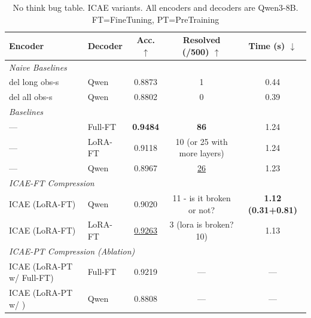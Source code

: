 \begin{table}[h]
  \centering
  \small
  \setlength{\tabcolsep}{4pt}
  \renewcommand{\arraystretch}{1.05}

  \begin{tabular}{|ll|ccc|}
      \hline
      \textbf{Encoder} & \textbf{Decoder} & \textbf{Acc. $\uparrow$} & \textbf{Resolved (/500) $\uparrow$} & \textbf{Time (s) $\downarrow$} \\
      \hline
      \multicolumn{5}{|l|}{\hspace{1em}\textit{Naive Baselines}} \\
      \hline
      del long obs-s            &     Qwen       & 0.8873 & 1         & 0.44                      \\
      del all obs-s             &     Qwen       & 0.8802 & 0         & 0.39                      \\
      \hline
      \multicolumn{5}{|l|}{\hspace{1em}\textit{Baselines}} \\
      \hline
      —                         & Full-FT   & \textbf{0.9484} & \textbf{86}              & 1.24                      \\
      —                         & LoRA-FT   & 0.9118 & 10 (or 25 with more layers)       & 1.24                      \\
      —                         & Qwen      & 0.8967 & \underline{26}                    & 1.23                      \\
      \hline
      \multicolumn{5}{|l|}{\hspace{1em}\textit{ICAE-FT Compression}} \\
      \hline
      ICAE (LoRA-FT)       & Qwen      & 0.9020             & 11 - is it broken or not?       & \textbf{1.12 (0.31+0.81)}    \\
      ICAE (LoRA-FT)       & LoRA-FT   & \underline{0.9263} & 3 (lora is broken? 10)          & 1.13                      \\
      \hline
      \multicolumn{5}{|l|}{\hspace{1em}\textit{ICAE-PT Compression (Ablation)}} \\
      \hline
      ICAE (LoRA-PT w/ Full-FT) & Full-FT   & 0.9219 & —         & —                         \\
      ICAE (LoRA-PT w/ )        & Qwen      & 0.8808 & —         & —                         \\
      \hline
  \end{tabular}
  \caption{No think bug table. ICAE variants. All encoders and decoders are Qwen3-8B. FT=FineTuning, PT=PreTraining}
  \label{tab:qwen_icae_variants_absolute}
\end{table}


